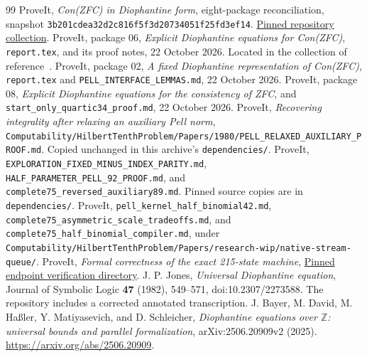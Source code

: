 \documentclass[11pt,a4paper]{article}
\theoremstyle{remark}\newtheorem{remark}[theorem]{Remark}
\newcommand{\src}[1]{\nolinkurl{#1}}
\newcommand{\pin}{\texttt{3b201cdea32d2c816f5f3d20734051f25fd3ef14}}
\begin{document}
\begin{thebibliography}{99}\small
{} ProveIt, \emph{Con(ZFC) in Diophantine form},
eight-package reconciliation, snapshot \pin.
\href{https://github.com/VladimirReshetnikov/ProveIt/tree/3b201cdea32d2c816f5f3d20734051f25fd3ef14/SetTheory/Cardinals/docs/reports/hilbert-tenth-problem/con-zfc-diophantine-forms}{Pinned repository collection}.
 ProveIt, package 06, \emph{Explicit Diophantine equations
for Con(ZFC)}, \src{report.tex}, and its proof notes, 22 October 2026.
Located in the collection of reference~\cite{reconciliation}.
 ProveIt, package 02, \emph{A fixed Diophantine
representation of Con(ZFC)}, \src{report.tex} and
\src{PELL_INTERFACE_LEMMAS.md}, 22 October 2026.
 ProveIt, package 08, \emph{Explicit Diophantine equations
for the consistency of ZFC}, and
\src{start_only_quartic34_proof.md}, 22 October 2026.
 ProveIt, \emph{Recovering integrality after relaxing an
auxiliary Pell norm},
\src{Computability/HilbertTenthProblem/Papers/1980/PELL_RELAXED_AUXILIARY_PROOF.md}.
Copied unchanged in this archive's \src{dependencies/}.
 ProveIt,
\src{EXPLORATION_FIXED_MINUS_INDEX_PARITY.md},
\src{HALF_PARAMETER_PELL_92_PROOF.md}, and
\src{complete75_reversed_auxiliary89.md}.
Pinned source copies are in \src{dependencies/}.
 ProveIt,
\src{pell_kernel_half_binomial42.md},
\src{complete75_asymmetric_scale_tradeoffs.md}, and
\src{complete75_half_binomial_compiler.md}, under
\src{Computability/HilbertTenthProblem/Papers/research-wip/native-stream-queue/}.
 ProveIt, \emph{Formal correctness of the exact 215-state machine},
\href{https://github.com/VladimirReshetnikov/ProveIt/tree/3b201cdea32d2c816f5f3d20734051f25fd3ef14/Computability/BusyBeaver/Research/ZFC/k225-formal/verification/k215}{Pinned endpoint verification directory}.
 J. P. Jones, \emph{Universal Diophantine equation},
Journal of Symbolic Logic \textbf{47} (1982), 549--571,
doi:10.2307/2273588. The repository includes a corrected annotated transcription.
 J. Bayer, M. David, M. Ha\ss ler, Y. Matiyasevich,
and D. Schleicher, \emph{Diophantine equations over $\mathbb Z$:
universal bounds and parallel formalization}, arXiv:2506.20909v2 (2025).
\url{https://arxiv.org/abs/2506.20909}.
\end{thebibliography}
\end{document}
